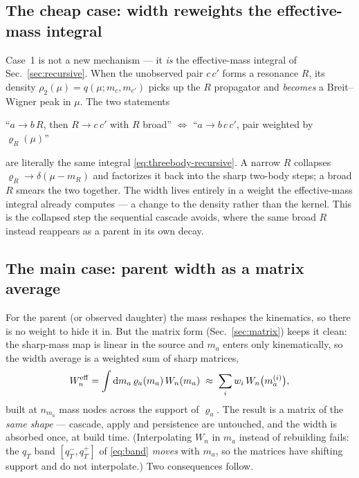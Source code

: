 \documentclass[11pt]{article}
\begin{document}
\subsection{The cheap case: width reweights the effective-mass integral}

Case~1 is not a new mechanism --- it \emph{is} the effective-mass integral
of Sec.~\ref{sec:recursive}.  When the unobserved pair $c\,c'$ forms a
resonance $R$, its density $\rho_2(\mu)=q(\mu;m_c,m_{c'})$ picks up the $R$
propagator and \emph{becomes} a Breit--Wigner peak in $\mu$.  The two
statements
\begin{center}
``$a\to b\,R$, then $R\to c\,c'$ with $R$ broad''
\quad$\Longleftrightarrow$\quad
``$a\to b\,c\,c'$, pair weighted by $\varrho_R(\mu)$''
\end{center}
are literally the same integral \eqref{eq:threebody-recursive}.  A narrow
$R$ collapses $\varrho_R\to\delta(\mu-m_R)$ and factorizes it back into the
sharp two-body steps; a broad $R$ smears the two together.  The width lives
entirely in a weight the effective-mass integral already computes --- a
change to the density rather than the kernel.  This is the collapsed step the
sequential cascade avoids, where the same broad $R$ instead reappears as a
parent in its own decay.

\subsection{The main case: parent width as a matrix average}

For the parent (or observed daughter) the mass reshapes the kinematics, so
there is no weight to hide it in.  But the matrix form (Sec.~\ref{sec:matrix})
keeps it clean: the sharp-mass map is linear in the source and $m_a$ enters
only kinematically, so the width average is a weighted sum of sharp matrices,
\begin{equation}
W^{\rm eff}_n=\int\mathrm{d}m_a\,\varrho_a(m_a)\,W_n(m_a)
\;\approx\;\sum_i w_i\,W_n\big(m_a^{(i)}\big),
\label{eq:width-matrixsum}
\end{equation}
built at $n_{m_a}$ mass nodes across the support of $\varrho_a$.  The result
is a matrix of the \emph{same shape} --- cascade, apply and persistence are
untouched, and the width is absorbed once, at build time.  (Interpolating
$W_n$ in $m_a$ instead of rebuilding fails: the $q_T$ band
$[q_T^-,q_T^+]$ of \eqref{eq:band} \emph{moves} with $m_a$, so the matrices
have shifting support and do not interpolate.)  Two consequences follow.
\end{document}
